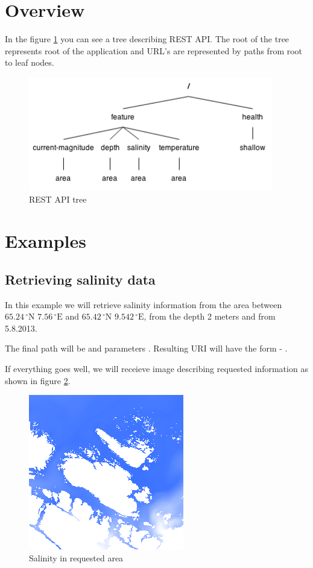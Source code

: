 \documentclass[11pt,a4paper,titlepage,oneside]{report}
\begin{document}
\section{Overview}

In the figure \ref{fig:rest_api_tree} you can see a tree describing REST API. The root of the tree represents root of the application and URL's are represented by paths from root to leaf nodes.

\begin{figure}[h]
	\centering
	\includegraphics[height=5cm]{img/REST_API.png}
	\caption{REST API tree}
	\label{fig:rest_api_tree}
\end{figure}

\section{Examples}

\subsection{Retrieving salinity data}
\label{subsec:rest_example_salinity}
In this example we will retrieve salinity information from the area between $65.24\,^{\circ}\mathrm{N}$ $7.56\,^{\circ}\mathrm{E}$ and $65.42\,^{\circ}\mathrm{N}$ $9.542\,^{\circ}\mathrm{E}$, from the depth 2 meters and from 5.8.2013.

The final path will be  and parameters . Resulting URI will have the form - .

If everything goes well, we will receieve image describing requested information as shown in figure \ref{fig:rest_example_1}.

\begin{figure}[h]
	\centering
	\includegraphics{img/REST_example_1.png}
	\caption{Salinity in requested area}
	\label{fig:rest_example_1}
\end{figure}
\end{document}
